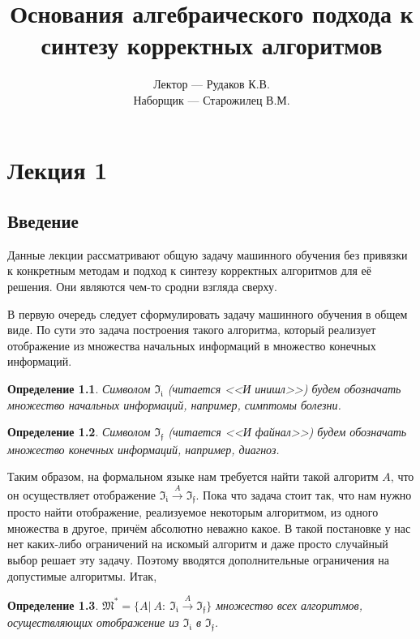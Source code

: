 \documentclass[a4paper, 12pt]{report}
\newtheorem*{definition}{Определение}
\begin{document}
\title{Основания алгебраического подхода к синтезу корректных алгоритмов}
\author{Лектор --- Рудаков К.В.\\ Наборщик --- Старожилец В.М.}
\date{}
\maketitle

\tableofcontents

\chapter{Лекция 1}
\section{Введение}
Данные лекции рассматривают общую задачу машинного обучения без привязки к конкретным методам и подход к синтезу корректных алгоритмов для её решения. Они являются чем-то сродни взгляда сверху.

В первую очередь следует сформулировать задачу машинного обучения в общем виде. По сути это задача построения такого алгоритма, который реализует отображение из множества начальных информаций в множество конечных информаций.

\begin{definition} 
Символом $\mathfrak{I_i}$ (читается <<И инишл>>) будем обозначать множество начальных информаций, например, симптомы болезни. 
\end{definition}

\begin{definition} 
Символом $\mathfrak{I_f}$ (читается <<И файнал>>) будем обозначать множество конечных информаций, например, диагноз. 
\end{definition}

Таким образом, на формальном языке нам требуется найти такой алгоритм $A$, что он осуществляет отображение $\mathfrak{I_i} \xrightarrow{A} \mathfrak{I_f}$. Пока что задача стоит так, что нам нужно просто найти отображение, реализуемое некоторым алгоритмом, из одного множества в другое, причём абсолютно неважно какое. В такой постановке у нас нет каких-либо ограничений на искомый алгоритм и даже просто случайный выбор решает эту задачу. Поэтому вводятся дополнительные ограничения на допустимые алгоритмы. Итак,

\begin{definition} 
$\mathfrak{M}^* = \{A|\ A:\  \mathfrak{I_i}\xrightarrow{A}\mathfrak{I_f}\}$ множество всех алгоритмов, осуществляющих отображение из $\mathfrak{I_i}$ в $\mathfrak{I_f}$. 
\end{definition}
\end{document}
